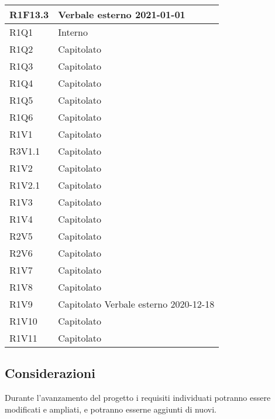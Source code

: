 \begin{center}
\begin{longtable}{|p{22mm}|p{22mm}|}
	\hline
R1F13.3	& Verbale esterno 2021-01-01 \\
	\hline
R1Q1	& Interno\\
	\hline
R1Q2	& Capitolato\\
\hline
R1Q3	& Capitolato\\
\hline
R1Q4	& Capitolato\\
\hline
R1Q5	& Capitolato\\
\hline
R1Q6	& Capitolato\\
\hline
R1V1	& Capitolato\\
	\hline
R3V1.1	& Capitolato\\
	\hline
R1V2	& Capitolato\\
	\hline
R1V2.1	& Capitolato\\
	\hline
R1V3	& Capitolato\\
	\hline
R1V4	& Capitolato\\
	\hline
R2V5	& Capitolato\\
	\hline
R2V6	& Capitolato\\
	\hline
R1V7	& Capitolato\\
	\hline
R1V8	& Capitolato\\
	\hline
R1V9	& 
	Capitolato \newline	
	Verbale esterno 2020-12-18
	\\
	\hline
R1V10	& Capitolato\\
	\hline
R1V11	& Capitolato\\
	\hline
	
	\end{longtable}
\end{center}

\subsection{Considerazioni}
Durante l'avanzamento del progetto i requisiti individuati potranno essere modificati e ampliati, e potranno esserne aggiunti di nuovi.
